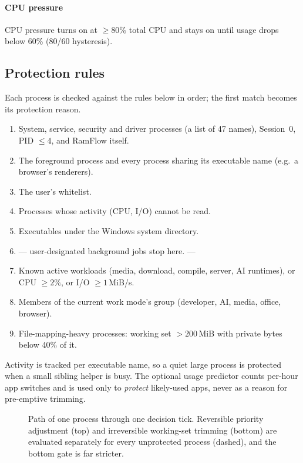 \documentclass[11pt]{article}
\begin{document}
\paragraph{CPU pressure}
CPU pressure turns on at $\ge$80\% total CPU and stays on until usage drops below 60\% (80/60 hysteresis).

\subsection{Protection rules}
\label{sec:protect}
Each process is checked against the rules below in order; the first match becomes its protection reason.
\begin{enumerate}[label=P\arabic*.,leftmargin=2.4em]
  \item System, service, security and driver processes (a list of 47 names), Session~0, PID $\le4$, and RamFlow itself.
  \item The foreground process and every process sharing its executable name (e.g.\ a browser's renderers).
  \item The user's whitelist.
  \item Processes whose activity (CPU, I/O) cannot be read.
  \item Executables under the Windows system directory.
  \item[] {\color{ink2}\small --- user-designated background jobs stop here. ---}
  \item Known active workloads (media, download, compile, server, AI runtimes), or CPU $\ge2\%$, or I/O $\ge1$\,MiB/s.
  \item Members of the current work mode's group (developer, AI, media, office, browser).
  \item File-mapping-heavy processes: working set $>200$\,MiB with private bytes below 40\% of it.
\end{enumerate}
\noindent Activity is tracked per executable name, so a quiet large process is protected when a small sibling helper is busy. The optional usage predictor counts per-hour app switches and is used only to \emph{protect} likely-used apps, never as a reason for pre-emptive trimming.

\begin{figure}[t]
  \centering
  
  \caption{Path of one process through one decision tick. Reversible priority adjustment (top) and irreversible working-set trimming (bottom) are evaluated separately for every unprotected process (dashed), and the bottom gate is far stricter.}
  \label{fig:decision}
\end{figure}
\end{document}
